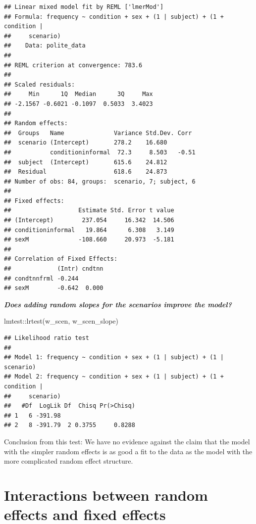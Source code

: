 \documentclass[
  openany]{book}
\newenvironment{Shaded}{\begin{snugshade}}{\end{snugshade}}
\newcommand{\FunctionTok}[1]{\textcolor[rgb]{0.00,0.00,0.00}{#1}}
\newcommand{\NormalTok}[1]{#1}
\newcommand{\SpecialCharTok}[1]{\textcolor[rgb]{0.00,0.00,0.00}{#1}}
\begin{document}
\begin{verbatim}
## Linear mixed model fit by REML ['lmerMod']
## Formula: frequency ~ condition + sex + (1 | subject) + (1 + condition |  
##     scenario)
##    Data: polite_data
## 
## REML criterion at convergence: 783.6
## 
## Scaled residuals: 
##     Min      1Q  Median      3Q     Max 
## -2.1567 -0.6021 -0.1097  0.5033  3.4023 
## 
## Random effects:
##  Groups   Name              Variance Std.Dev. Corr 
##  scenario (Intercept)       278.2    16.680        
##           conditioninformal  72.3     8.503   -0.51
##  subject  (Intercept)       615.6    24.812        
##  Residual                   618.6    24.873        
## Number of obs: 84, groups:  scenario, 7; subject, 6
## 
## Fixed effects:
##                   Estimate Std. Error t value
## (Intercept)        237.054     16.342  14.506
## conditioninformal   19.864      6.308   3.149
## sexM              -108.660     20.973  -5.181
## 
## Correlation of Fixed Effects:
##             (Intr) cndtnn
## condtnnfrml -0.244       
## sexM        -0.642  0.000
\end{verbatim}

\textbf{\emph{Does adding random slopes for the scenarios improve the model?}}

\begin{Shaded}
\begin{Highlighting}[]
\NormalTok{lmtest}\SpecialCharTok{::}\FunctionTok{lrtest}\NormalTok{(w\_scen, w\_scen\_slope)}
\end{Highlighting}
\end{Shaded}

\begin{verbatim}
## Likelihood ratio test
## 
## Model 1: frequency ~ condition + sex + (1 | subject) + (1 | scenario)
## Model 2: frequency ~ condition + sex + (1 | subject) + (1 + condition | 
##     scenario)
##   #Df  LogLik Df  Chisq Pr(>Chisq)
## 1   6 -391.98                     
## 2   8 -391.79  2 0.3755     0.8288
\end{verbatim}

Conclusion from this test: We have no evidence against the claim that the model with the simpler random effects is as good a fit to the data as the model with the more complicated random effect structure.

\hypertarget{interactions-between-random-effects-and-fixed-effects}{%
\section{Interactions between random effects and fixed effects}\label{interactions-between-random-effects-and-fixed-effects}}
\end{document}
